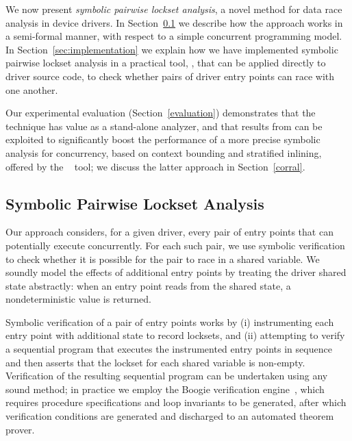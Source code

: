 
We now present \emph{symbolic pairwise lockset analysis}, a novel method for data race analysis in device drivers.  In Section~\ref{sec:symbolicpairwise} we describe how the approach works in a semi-formal manner, with respect to a simple concurrent programming model.  In Section~\ref{sec:implementation} we explain how we have implemented symbolic pairwise lockset analysis in a practical tool, \whoop, that can be applied directly to driver source code, to check whether pairs of driver entry points can race with one another.

Our experimental evaluation (Section~\ref{evaluation}) demonstrates that the \whoop technique has value as a stand-alone analyzer, and that results from \whoop can be exploited to significantly boost the performance of a more precise symbolic analysis for concurrency, based on context bounding and stratified inlining, offered by the \corral~\cite{lal2012corral} tool; we discuss the latter approach in Section~\ref{corral}.

\subsection{Symbolic Pairwise Lockset Analysis}
\label{sec:symbolicpairwise}



Our approach considers, for a given driver, every pair of entry points that can potentially execute concurrently.  For each such pair, we use symbolic verification to check whether it is possible for the pair to race in a shared variable. We soundly model the effects of additional entry points by treating the driver shared state abstractly: when an entry point reads from the shared state, a nondeterministic value is returned.  

Symbolic verification of a pair of entry points works by (i) instrumenting each entry point with additional state to record locksets, and (ii) attempting to verify a sequential program that executes the instrumented entry points in sequence and then asserts that the lockset for each shared variable is non-empty.  Verification of the resulting sequential program can be undertaken using any sound method; in practice we employ the Boogie verification engine~\cite{barnett2006boogie}, which requires procedure specifications and loop invariants to be generated, after which verification conditions are generated and discharged to an automated theorem prover.

